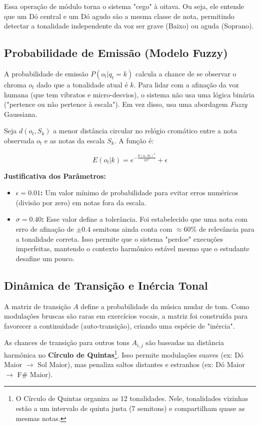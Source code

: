 \documentclass[11pt, a4paper]{article}
\theoremstyle{plain}
\theoremstyle{definition}
\begin{document}
Essa operação de módulo torna o sistema "cego" à oitava. Ou seja, ele entende que um Dó central e um Dó agudo são a mesma classe de nota, permitindo detectar a tonalidade independente da voz ser grave (Baixo) ou aguda (Soprano).

\subsection{Probabilidade de Emissão (Modelo Fuzzy)}

A probabilidade de emissão $P(o_t | q_t = k)$ calcula a chance de se observar o chroma $o_t$ dado que a tonalidade atual é $k$. Para lidar com a afinação da voz humana (que tem vibratos e micro-desvios), o sistema não usa uma lógica binária ("pertence ou não pertence à escala"). Em vez disso, usa uma abordagem \textit{Fuzzy} Gaussiana.

Seja $d(o_t, S_k)$ a menor distância circular no relógio cromático entre a nota observada $o_t$ e as notas da escala $S_k$. A função é:

\begin{equation}
    E(o_t | k) = e^{-\frac{d(o_t, S_k)^2}{2\sigma^2}} + \epsilon
\end{equation}

\textbf{Justificativa dos Parâmetros:}
\begin{itemize}
    \item \textbf{$\epsilon = 0.01$:} Um valor mínimo de probabilidade para evitar erros numéricos (divisão por zero) em notas fora da escala.
    \item \textbf{$\sigma = 0.40$:} Esse valor define a tolerância. Foi estabelecido que uma nota com erro de afinação de $\pm 0.4$ semitons ainda conta com $\approx 60\%$ de relevância para a tonalidade correta. Isso permite que o sistema "perdoe" execuções imperfeitas, mantendo o contexto harmônico estável mesmo que o estudante desafine um pouco.
\end{itemize}

\subsection{Dinâmica de Transição e Inércia Tonal}

A matriz de transição $A$ define a probabilidade da música mudar de tom. Como modulações bruscas são raras em exercícios vocais, a matriz foi construída para favorecer a continuidade (auto-transição), criando uma espécie de "inércia".

As chances de transição para outros tons $A_{i,j}$ são baseadas na distância harmônica no \textbf{Círculo de Quintas}\footnote{O Círculo de Quintas organiza as 12 tonalidades. Nele, tonalidades vizinhas estão a um intervalo de quinta justa (7 semitons) e compartilham quase as mesmas notas.}. Isso permite modulações suaves (ex: Dó Maior $\to$ Sol Maior), mas penaliza saltos distantes e estranhos (ex: Dó Maior $\to$ F\# Maior).
\end{document}

